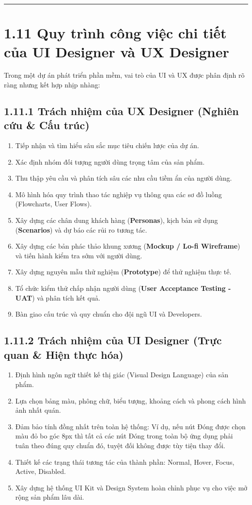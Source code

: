 \documentclass[11pt,a4paper,oneside]{report}
\begin{document}
\bigskip\hrule\bigskip

\section{1.11 Quy trình công việc chi tiết của UI Designer và UX Designer}

Trong một dự án phát triển phần mềm, vai trò của UI và UX được phân định rõ ràng nhưng kết hợp nhịp nhàng:


\subsection{1.11.1 Trách nhiệm của UX Designer (Nghiên cứu \& Cấu trúc)}
\begin{enumerate}[leftmargin=1.5em]
\item Tiếp nhận và tìm hiểu sâu sắc mục tiêu chiến lược của dự án.
\item Xác định nhóm đối tượng người dùng trọng tâm của sản phẩm.
\item Thu thập yêu cầu và phân tích sâu các nhu cầu tiềm ẩn của người dùng.
\item Mô hình hóa quy trình thao tác nghiệp vụ thông qua các sơ đồ luồng (Flowcharts, User Flows).
\item Xây dựng các chân dung khách hàng (\textbf{Personas}), kịch bản sử dụng (\textbf{Scenarios}) và dự báo các rủi ro tương tác.
\item Xây dựng các bản phác thảo khung xương (\textbf{Mockup / Lo-fi Wireframe}) và tiến hành kiểm tra sớm với người dùng.
\item Xây dựng nguyên mẫu thử nghiệm (\textbf{Prototype}) để thử nghiệm thực tế.
\item Tổ chức kiểm thử chấp nhận người dùng (\textbf{User Acceptance Testing - UAT}) và phân tích kết quả.
\item Bàn giao cấu trúc và quy chuẩn cho đội ngũ UI và Developers.
\end{enumerate}

\subsection{1.11.2 Trách nhiệm của UI Designer (Trực quan \& Hiện thực hóa)}
\begin{enumerate}[leftmargin=1.5em]
\item Định hình ngôn ngữ thiết kế thị giác (Visual Design Language) của sản phẩm.
\item Lựa chọn bảng màu, phông chữ, biểu tượng, khoảng cách và phong cách hình ảnh nhất quán.
\item Đảm bảo tính đồng nhất trên toàn hệ thống: Ví dụ, nếu nút Đóng được chọn màu đỏ bo góc 8px thì tất cả các nút Đóng trong toàn bộ ứng dụng phải tuân theo đúng quy chuẩn đó, tuyệt đối không được tùy tiện thay đổi.
\item Thiết kế các trạng thái tương tác của thành phần: Normal, Hover, Focus, Active, Disabled.
\item Xây dựng hệ thống UI Kit và Design System hoàn chỉnh phục vụ cho việc mở rộng sản phẩm lâu dài.
\end{enumerate}
\end{document}

